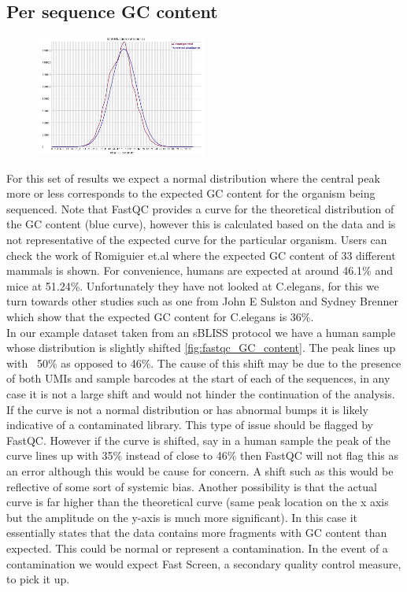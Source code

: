 \subsection{Per sequence GC content \label{subsec:fastqc_GC_content}}
\begin{figure}
  \begin{center}
    \includegraphics[width=0.5\textwidth]{figures/FastQC_GC_content.png}
  \end{center}
  \label{fig:fastqc_GC_content}
\end{figure}
For this set of results we expect a normal distribution where the central peak more or less corresponds to the expected GC content for the organism being sequenced. Note that FastQC provides a curve for the theoretical distribution of the GC content (blue curve), however this is calculated based on the data and is not representative of the expected curve for the particular organism. Users can check the work of Romiguier et.al \cite{romiguier2010contrasting} where the expected GC content of 33 different mammals is shown. For convenience, humans are expected at around 46.1\% and mice at 51.24\%. Unfortunately they have not looked at C.elegans, for this we turn towards other studies such as one from John E Sulston and Sydney Brenner \cite{sulston1974dna} which show that the expected GC content for C.elegans is 36\%.\\
In our example dataset taken from an sBLISS protocol we have a human sample whose distribution is slightly shifted \autoref{fig:fastqc_GC_content}. The peak lines up with ~50\% as opposed to 46\%. The cause of this shift may be due to the presence of both UMIs and sample barcodes at the start of each of the sequences, in any case it is not a large shift and would not hinder the continuation of the analysis.\\
If the curve is not a normal distribution or has abnormal bumps it is likely indicative of a contaminated library. This type of issue should be flagged by FastQC. However if the curve is shifted, say in a human sample the peak of the curve lines up with 35\% instead of close to 46\% then FastQC will not flag this as an error although this would be cause for concern. A shift such as this would be reflective of some sort of systemic bias. Another possibility is that the actual curve is far higher than the theoretical curve (same peak location on the x axis but the amplitude on the y-axis is much more significant). In this case it essentially states that the data contains more fragments with GC content than expected. This could be normal or represent a contamination. In the event of a contamination we would expect Fast Screen, a secondary quality control measure, to pick it up.

